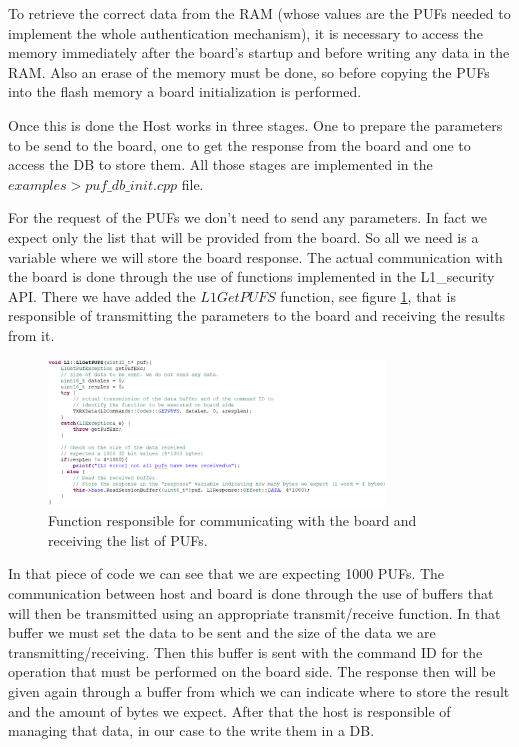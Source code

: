 To retrieve the correct data from the RAM (whose values are the PUFs needed to implement the whole authentication mechanism), it is necessary to access the memory immediately after the board's startup and before writing any data in the RAM. Also an erase of the memory must be done, so before copying the PUFs into the flash memory a board initialization is performed.

Once this is done the Host works in three stages. One to prepare the parameters to be send to the board, one to get the response from the board and one to access the DB to store them. All those stages are implemented in the $examples > puf\_db\_init.cpp$ file.

For the request of the PUFs we don't need to send any parameters. In fact we expect only the list that will be provided from the board. So all we need is a variable where we will store the board response.
The actual communication with the board is done through the use of functions implemented in the L1\_security API. There we have added the $L1GetPUFS$ function, see figure \ref{fig:L1GetPUFS}, that is responsible of transmitting the parameters to the board and receiving the results from it.

\begin{figure}[h!]
	\vspace{0.5cm}
	\includegraphics[width = 0.8\textwidth]{images/L1GetPUFS.png}
	\caption{Function responsible for communicating with the board and receiving the list of PUFs. }
	\label{fig:L1GetPUFS}
\end{figure}

In that piece of code we can see that we are expecting 1000 PUFs. The communication between host and board is done through the use of buffers that will then be transmitted using an appropriate transmit/receive function. In that buffer we must set the data to be sent and the size of the data we are transmitting/receiving. Then this buffer is sent with the command ID for the operation that must be performed on the board side. The response then will be given again through a buffer from which we can indicate where to store the result and the amount of bytes we expect. After that the host is responsible of managing that data, in our case to the write them in a DB.


